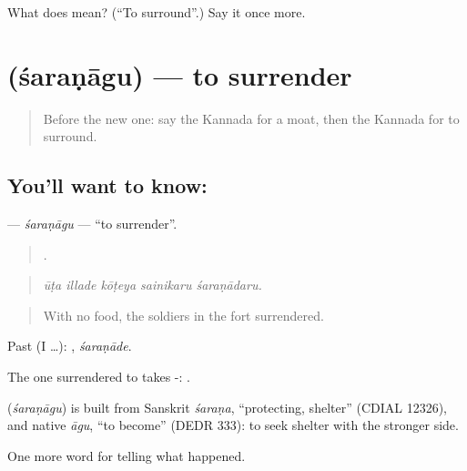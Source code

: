\begin{tcolorbox}[breakable,colback=teal!4,colframe=teal!35!black,title={Before you move on}]
What does  mean? (\textquotedblleft{}To surround\textquotedblright{}.) Say it once more.
\end{tcolorbox}
\section[\texorpdfstring{\kn{ಶರಣಾಗು} (śaraṇāgu)}{ಶರಣಾಗು (śaraṇāgu)}]{ (śaraṇāgu) — to surrender}

\label{lesson:KA-C342-saranagu}



\begin{quote}
Before the new one: say the Kannada for a moat, then the Kannada for to surround.
\end{quote}

\subsection*{You'll want to know: }
\textbf{} — \emph{śaraṇāgu} — \textquotedblleft{}to surrender\textquotedblright{}.

\begin{quote}
    .
\end{quote}

\begin{quote}
\emph{ūṭa illade kōṭeya sainikaru śaraṇādaru.}
\end{quote}

\begin{quote}
With no food, the soldiers in the fort surrendered.
\end{quote}

Past (I …): , \emph{śaraṇāde}.

The one surrendered to takes -:  .

\begin{cousinweb}
\textbf{} (\emph{śaraṇāgu}) is built from Sanskrit \emph{śaraṇa}, \textquotedblleft{}protecting, shelter\textquotedblright{} (CDIAL 12326), and native \emph{āgu}, \textquotedblleft{}to become\textquotedblright{} (DEDR 333): to seek shelter with the stronger side.
\end{cousinweb}

\begin{grammarlens}[title={What you've built}]
One more word for telling what happened.
\end{grammarlens}

